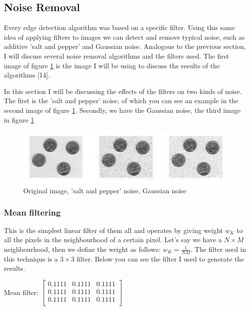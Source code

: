 \documentclass[12pt]{article}
\begin{document}
\subsection{Noise Removal}

Every edge detection algorithm was based on a specific filter. Using this same idea of applying filters to images we can detect and remove typical noise, such as additive 'salt and pepper' and Gaussian noise. Analogous to the previous section, I will discuss several noise removal algorithms and the filters used. The first image of figure \ref{noise_original} is the image I will be using to discuss the results of the algorithms [14].
\newline

In this section I will be discussing the effects of the filters on two kinds of noise. The first is the 'salt and pepper' noise, of which you can see an example in the second image of figure \ref{noise_original}. Secondly, we have the Gaussian noise, the third image in figure \ref{noise_original}

\begin{figure}[h]
\hspace*{-0.8cm}
\centering
\includegraphics[scale = 1]{img/noise_orig}
\caption{Original image, 'salt and pepper' noise, Gaussian noise}
\label{noise_original}
\end{figure}

\subsubsection{Mean filtering}

This is the simplest linear filter of them all and operates by giving weight $w_K$ to all the pixels in the neighbourhood of a certain pixel. Let's say we have a $N\times M$ neighbourhood, then we define the weight as follows: $w_K = \frac{1}{NM}$. The filter used in this technique is a $3\times3$ filter. Below you can see the filter I used to generate the results.
\newline

Mean filter:
$\begin{bmatrix}
	0.1111 & 0.1111 & 0.1111 \\
	0.1111 & 0.1111 & 0.1111 \\
	0.1111 & 0.1111 & 0.1111 \\
\end{bmatrix}$
\newline
\end{document}
